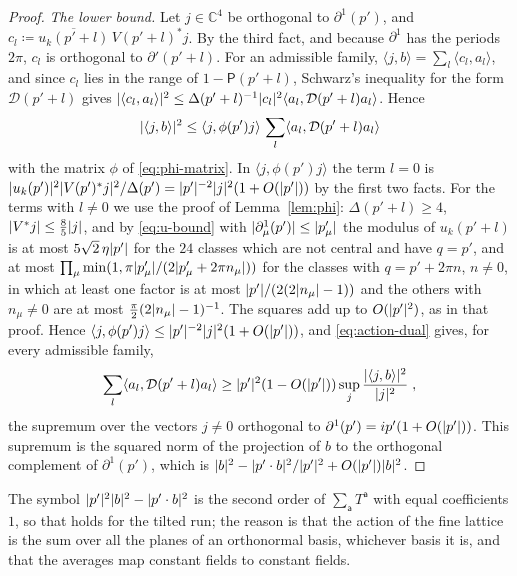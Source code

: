 \documentclass[11pt]{preprint}
\DeclarePairedDelimiter{\abs}{\lvert}{\rvert}
\numberwithin{equation}{section}
\theoremstyle{definition}
\theoremstyle{remark}
\theoremstyle{plain}
\begin{document}
\begin{proof}
\emph{The lower bound.} Let $j \in \mathbb C^4$ be orthogonal to $\partial^1(p')$, and $c_l \coloneqq \overline{u_k(p' + l)}\,V(p' + l)^*j$. By the third fact, and because $\partial^1$ has the periods $2\pi$, $c_l$ is orthogonal to $\partial'(p' + l)$. For an admissible family, $\langle j, b\rangle = \sum_l\langle c_l, a_l\rangle$, and since $c_l$ lies in the range of $1 - \mathsf P(p' + l)$, Schwarz's inequality for the form $\mathcal D(p' + l)$ gives $\abs{\langle c_l, a_l\rangle}^2 \leq \Delta(p' + l)^{-1}\abs{c_l}^2\langle a_l, \mathcal D(p' + l)a_l\rangle$. Hence
\begin{equation}\label{eq:action-dual}
    \abs{\langle j, b\rangle}^2 \leq \langle j, \phi(p')j\rangle\,\sum_l\langle a_l, \mathcal D(p' + l)a_l\rangle
\end{equation}
with the matrix $\phi$ of \eqref{eq:phi-matrix}. In $\langle j, \phi(p')j\rangle$ the term $l = 0$ is $\abs{u_k(p')}^2\abs{V(p')^*j}^2/\Delta(p') = \abs{p'}^{-2}\abs j^2(1 + O(\abs{p'}))$ by the first two facts. For the terms with $l \neq 0$ we use the proof of Lemma~\ref{lem:phi}: $\Delta(p' + l) \geq 4$, $\abs{V^*j} \leq \frac85\abs j$, and by \eqref{eq:u-bound} with $\abs{\partial^1_\mu(p')} \leq \abs{p'_\mu}$ the modulus of $u_k(p' + l)$ is at most $5\sqrt2\,\eta\abs{p'}$ for the $24$ classes which are not central and have $q = p'$, and at most $\prod_\mu\min(1, \pi\abs{p'_\mu}/(2\abs{p'_\mu + 2\pi n_\mu}))$ for the classes with $q = p' + 2\pi n$, $n \neq 0$, in which at least one factor is at most $\abs{p'}/(2(2\abs{n_\mu} - 1))$ and the others with $n_\mu \neq 0$ are at most $\frac\pi2(2\abs{n_\mu} - 1)^{-1}$. The squares add up to $O(\abs{p'}^2)$, as in that proof. Hence $\langle j, \phi(p')j\rangle \leq \abs{p'}^{-2}\abs j^2(1 + O(\abs{p'}))$, and \eqref{eq:action-dual} gives, for every admissible family,
\begin{equation}\label{eq:action-lower}
    \sum_l\langle a_l, \mathcal D(p' + l)a_l\rangle \geq \abs{p'}^2(1 - O(\abs{p'}))\sup_j\frac{\abs{\langle j, b\rangle}^2}{\abs j^2}\;,
\end{equation}
the supremum over the vectors $j \neq 0$ orthogonal to $\partial^1(p') = ip'(1 + O(\abs{p'}))$. This supremum is the squared norm of the projection of $b$ to the orthogonal complement of $\partial^1(p')$, which is $\abs b^2 - \abs{p' \cdot b}^2/\abs{p'}^2 + O(\abs{p'})\abs b^2$.
\end{proof}

The symbol $\abs{p'}^2\abs b^2 - \abs{p' \cdot b}^2$ is the second order of $\sum_{\mathsf a}T^{\mathsf a}$ with equal coefficients $1$, so that \cite[(4.41)]{BalabanRG1} holds for the tilted run; the reason is that the action of the fine lattice is the sum over all the planes of an orthonormal basis, whichever basis it is, and that the averages map constant fields to constant fields.
\end{document}
